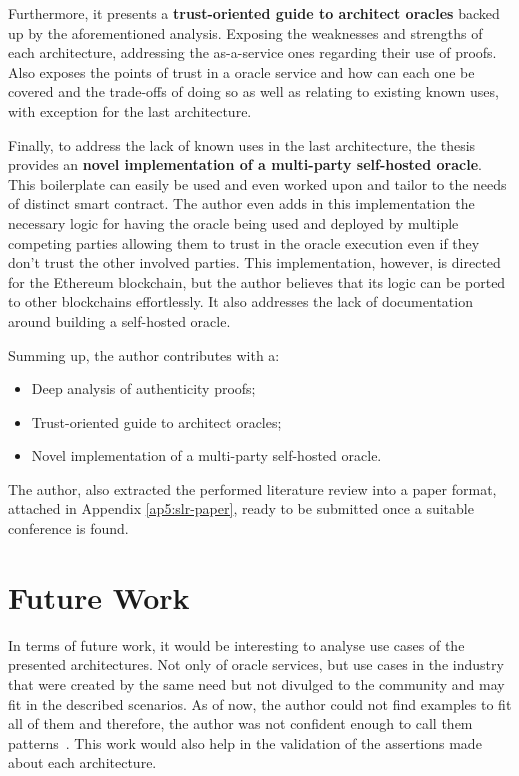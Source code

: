 Furthermore, it presents a \textbf{trust-oriented guide to architect oracles} backed up by the aforementioned analysis. Exposing the weaknesses and strengths of each architecture, addressing the as-a-service ones regarding their use of proofs. Also exposes the points of trust in a oracle service and how can each one be covered and the trade-offs of doing so as well as relating to existing known uses, with exception for the last architecture.

Finally, to address the lack of known uses in the last architecture, the thesis provides an \textbf{novel implementation of a multi-party self-hosted oracle}. This boilerplate can easily be used and even worked upon and tailor to the needs of distinct smart contract. The author even adds in this implementation the necessary logic for having the oracle being used and deployed by multiple competing parties allowing them to trust in the oracle execution even if they don't trust the other involved parties. This implementation, however, is directed for the Ethereum blockchain, but the author believes that its logic can be ported to other blockchains effortlessly. It also addresses the lack of documentation around building a self-hosted oracle.


\vspace{1cm}
Summing up, the author contributes with a:

\begin{itemize}
    \item Deep analysis of authenticity proofs;
    \item Trust-oriented guide to architect oracles;
    \item Novel implementation of a multi-party self-hosted oracle.
\end{itemize}

The author, also extracted the performed literature review into a paper format, attached in Appendix \ref{ap5:slr-paper}, ready to be submitted once a suitable conference is found.

\section{Future Work}

In terms of future work, it would be interesting to analyse use cases of the presented architectures. Not only of oracle services, but use cases in the industry that were created by the same need but not divulged to the community and may fit in the described scenarios. As of now, the author could not find examples to fit all of them and therefore, the author was not confident enough to call them patterns~\citet{Alexander,Gamma1995}. This work would also help in the validation of the assertions made about each architecture.

